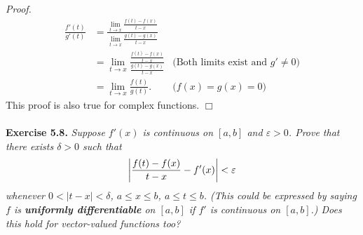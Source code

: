 \documentclass{article}
\begin{document}
\emph{Proof.}
\begin{align*}
  \frac{f'(t)}{g'(t)}
  &= \frac{\lim_{t \to x}{\frac{f(t)-f(x)}{t-x}}}{\lim_{t \to x}{\frac{g(t)-g(x)}{t-x}}} \\
  &= \lim_{t \to x} \frac{{\frac{f(t)-f(x)}{t-x}}}{{\frac{g(t)-g(x)}{t-x}}}
    &\text{(Both limits exist and $g' \neq 0$)} \\
  &= \lim_{t \to x} \frac{f(t)}{g(t)}.
    &\text{($f(x)=g(x)=0$)}
\end{align*}
This proof is also true for complex functions.
$\Box$ \\\\






\textbf{Exercise 5.8.}
\emph{Suppose $f'(x)$ is continuous on $[a,b]$ and $\varepsilon > 0$.
Prove that there exists $\delta > 0$ such that
\[
  \abs{ \frac{f(t)-f(x)}{t-x} - f'(x) } < \varepsilon
\]
whenever $0 < |t-x| < \delta$, $a \leq x \leq b$, $a \leq t \leq b$.
(This could be expressed by saying $f$ is \textbf{uniformly differentiable}
on $[a,b]$ if $f'$ is continuous on $[a,b]$.)
Does this hold for vector-valued functions too?} \\
\end{document}
